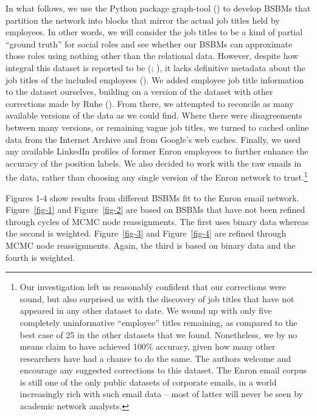 \documentclass[
  12pt,
  a4paper,
  DIV=11,
  numbers=noendperiod,
  twoside,
  open=any]{scrartcl}
\begin{document}
In what follows, we use the Python package graph-tool
() to develop BSBMs that
partition the network into blocks that mirror the actual job titles held
by employees. In other words, we will consider the job titles to be a
kind of partial ``ground truth'' for social roles and see whether our
BSBMs can approximate those roles using nothing other than the
relational data. However, despite how integral this dataset is reported
to be (;
), it lacks
definitive metadata about the job titles of the included employees
(). We
added employee job title information to the dataset ourselves, building
on a version of the dataset with other corrections made by Ruhe
(). From there, we attempted to
reconcile as many available versions of the data as we could find. Where
there were disagreements between many versions, or remaining vague job
titles, we turned to cached online data from the Internet Archive and
from Google's web caches. Finally, we used any available LinkedIn
profiles of former Enron employees to further enhance the accuracy of
the position labels. We also decided to work with the raw emails in the
data, rather than choosing any single version of the Enron network to
trust.\footnote{Our investigation left us reasonably confident that our
  corrections were sound, but also surprised us with the discovery of
  job titles that have not appeared in any other dataset to date. We
  wound up with only five completely uninformative ``employee'' titles
  remaining, as compared to the best case of 25 in the other datasets
  that we found. Nonetheless, we by no means claim to have achieved
  100\% accuracy, given how many other researchers have had a chance to
  do the same. The authors welcome and encourage any suggested
  corrections to this dataset. The Enron email corpus is still one of
  the only public datasets of corporate emails, in a world increasingly
  rich with such email data -- most of latter will never be seen by
  academic network analysts.}

Figures 1-4 show results from different BSBMs fit to the Enron email
network. Figure~\ref{fig-1} and Figure~\ref{fig-2} are based on BSBMs
that have not been refined through cycles of MCMC node reassignments.
The first uses binary data whereas the second is weighted.
Figure~\ref{fig-3} and Figure~\ref{fig-4} are refined through MCMC node
reassignments. Again, the third is based on binary data and the fourth
is weighted.
\end{document}
